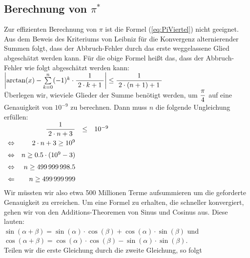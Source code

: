 \subsection{Berechnung von $\pi^*$}
Zur effizienten Berechnung von $\pi$ ist die  Formel (\ref{eq:PiViertel}) nicht geeignet.
Aus dem Beweis des Kriteriums von Leibniz f\"ur die Konvergenz alternierender Summen folgt,
dass der Abbruch-Fehler durch das erste weggelassene Glied abgesch\"atzt werden kann.  F\"ur die obige
Formel hei{\ss}t das, dass der Abbruch-Fehler wie folgt abgesch\"atzt werden kann:
\\[0.3cm]
\hspace*{1.3cm}
$\left|\arctan(x) - \sum\limits_{k=0}^n (-1)^k \cdot  \displaystyle\frac{\;\displaystyle1\;}{\;\displaystyle2\cdot k+1\;}\right| \leq \displaystyle\frac{\;\displaystyle1\;}{\;\displaystyle2\cdot (n+1)+1\;}$
\\[0.3cm]
\"Uberlegen wir, wieviele Glieder der Summe ben\"otigt werden, um $\displaystyle\frac{\pi}{4}$ auf eine Genauigkeit von $10^{-9}$ 
zu berechnen.  Dann muss $n$ die folgende Ungleichung erf\"ullen:
\\[0.2cm]
\hspace*{1.3cm} 
$
\begin{array}[t]{lrcl} 
                & \displaystyle\frac{\;\displaystyle1\;}{\;\displaystyle2\cdot n+3\;} & \leq & 10^{-9} \\[0.3cm]
\Leftrightarrow & 2\cdot n+3 \geq 10^9                   \\[0.2cm]
\Leftrightarrow & n \geq 0.5\cdot (10^9-3)                    \\[0.2cm]
\Leftrightarrow & n \geq 499\,999\,998.5                    \\[0.2cm]
\Leftarrow      & n \geq 499\,999\,999                    \\[0.2cm]
\end{array}
$
\\[0.2cm]
Wir  m\"ussten wir also etwa 500 Millionen Terme aufsummieren um die geforderte Genauigkeit
zu erreichen.  Um eine Formel zu erhalten, die schneller konvergiert, gehen wir von den
Additions-Theoremen von Sinus und Cosinus aus.  Diese lauten:
\\[0.2cm]
\hspace*{1.3cm}
$\sin(\alpha + \beta) = \sin(\alpha) \cdot \cos(\beta) + \cos(\alpha) \cdot \sin(\beta)$ \quad und
\\[0.2cm]
\hspace*{1.3cm}
$\cos(\alpha + \beta) = \cos(\alpha) \cdot \cos(\beta) - \sin(\alpha) \cdot \sin(\beta)$.
\\[0.2cm]
Teilen wir die erste Gleichung durch die zweite Gleichung, so folgt
